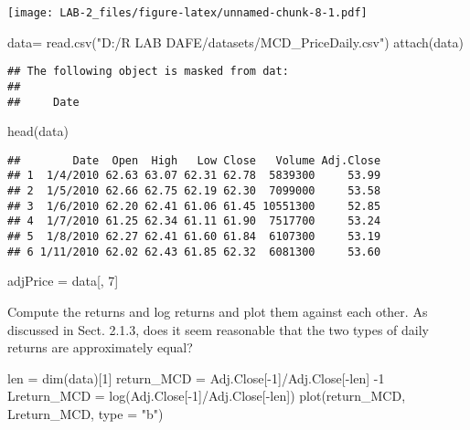 \documentclass[
]{article}
\newenvironment{Shaded}{\begin{snugshade}}{\end{snugshade}}
\newcommand{\AttributeTok}[1]{\textcolor[rgb]{0.77,0.63,0.00}{#1}}
\newcommand{\DecValTok}[1]{\textcolor[rgb]{0.00,0.00,0.81}{#1}}
\newcommand{\FunctionTok}[1]{\textcolor[rgb]{0.00,0.00,0.00}{#1}}
\newcommand{\NormalTok}[1]{#1}
\newcommand{\OtherTok}[1]{\textcolor[rgb]{0.56,0.35,0.01}{#1}}
\newcommand{\SpecialCharTok}[1]{\textcolor[rgb]{0.00,0.00,0.00}{#1}}
\newcommand{\StringTok}[1]{\textcolor[rgb]{0.31,0.60,0.02}{#1}}
\begin{document}
\texttt{[image: LAB-2\_files/figure-latex/unnamed-chunk-8-1.pdf]}

\begin{Shaded}
\begin{Highlighting}[]
\NormalTok{data}\OtherTok{=} \FunctionTok{read.csv}\NormalTok{(}\StringTok{"D:/R LAB DAFE/datasets/MCD\_PriceDaily.csv"}\NormalTok{)}
\FunctionTok{attach}\NormalTok{(data)}
\end{Highlighting}
\end{Shaded}

\begin{verbatim}
## The following object is masked from dat:
## 
##     Date
\end{verbatim}

\begin{Shaded}
\begin{Highlighting}[]
\FunctionTok{head}\NormalTok{(data)}
\end{Highlighting}
\end{Shaded}

\begin{verbatim}
##        Date  Open  High   Low Close   Volume Adj.Close
## 1  1/4/2010 62.63 63.07 62.31 62.78  5839300     53.99
## 2  1/5/2010 62.66 62.75 62.19 62.30  7099000     53.58
## 3  1/6/2010 62.20 62.41 61.06 61.45 10551300     52.85
## 4  1/7/2010 61.25 62.34 61.11 61.90  7517700     53.24
## 5  1/8/2010 62.27 62.41 61.60 61.84  6107300     53.19
## 6 1/11/2010 62.02 62.43 61.85 62.32  6081300     53.60
\end{verbatim}

\begin{Shaded}
\begin{Highlighting}[]
\NormalTok{adjPrice }\OtherTok{=}\NormalTok{ data[, }\DecValTok{7}\NormalTok{]}
\end{Highlighting}
\end{Shaded}

Compute the returns and log returns and plot them against each other. As
discussed in Sect. 2.1.3, does it seem reasonable that the two types of
daily returns are approximately equal?

\begin{Shaded}
\begin{Highlighting}[]
\NormalTok{len }\OtherTok{=} \FunctionTok{dim}\NormalTok{(data)[}\DecValTok{1}\NormalTok{]}
\NormalTok{return\_MCD }\OtherTok{=}\NormalTok{ Adj.Close[}\SpecialCharTok{{-}}\DecValTok{1}\NormalTok{]}\SpecialCharTok{/}\NormalTok{Adj.Close[}\SpecialCharTok{{-}}\NormalTok{len] }\SpecialCharTok{{-}}\DecValTok{1}
\NormalTok{Lreturn\_MCD }\OtherTok{=} \FunctionTok{log}\NormalTok{(Adj.Close[}\SpecialCharTok{{-}}\DecValTok{1}\NormalTok{]}\SpecialCharTok{/}\NormalTok{Adj.Close[}\SpecialCharTok{{-}}\NormalTok{len])}
\FunctionTok{plot}\NormalTok{(return\_MCD, Lreturn\_MCD, }\AttributeTok{type =} \StringTok{"b"}\NormalTok{)}
\end{Highlighting}
\end{Shaded}
\end{document}
